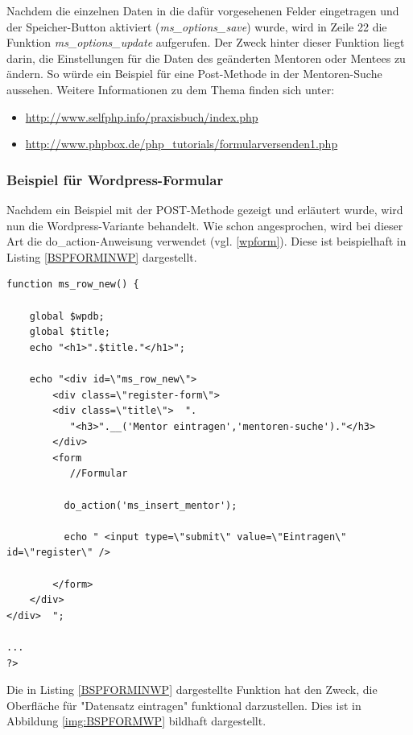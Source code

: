 Nachdem die einzelnen Daten in die dafür vorgesehenen Felder eingetragen und der Speicher-Button aktiviert (\emph{ms\_options\_save}) wurde, wird in Zeile 22 die Funktion \emph{ms\_options\_update} aufgerufen. Der Zweck hinter dieser Funktion liegt darin, die Einstellungen für die Daten des geänderten Mentoren oder Mentees zu ändern.\newline
So würde ein Beispiel für eine Post-Methode in der Mentoren-Suche aussehen. Weitere Informationen zu dem Thema finden sich unter:
\begin{itemize}
	\item \url{http://www.selfphp.info/praxisbuch/index.php}
	\item \url{http://www.phpbox.de/php\_tutorials/formularversenden1.php}
\end{itemize}
\subsubsection{Beispiel für Wordpress-Formular}
Nachdem ein Beispiel mit der POST-Methode gezeigt und erläutert wurde, wird nun die Wordpress-Variante behandelt.\newline
Wie schon angesprochen, wird bei dieser Art die do\_action-Anweisung verwendet (vgl. \ref{wpform}). Diese ist beispielhaft in Listing \ref{BSPFORMINWP} dargestellt.
\begin{lstlisting}
function ms_row_new() {
	
	global $wpdb;
	global $title;
	echo "<h1>".$title."</h1>";
	
	echo "<div id=\"ms_row_new\">  
        <div class=\"register-form\">  
        <div class=\"title\">  ".
           "<h3>".__('Mentor eintragen','mentoren-suche')."</h3>
        </div>  
        <form
           //Formular

		  do_action('ms_insert_mentor');
			
		  echo " <input type=\"submit\" value=\"Eintragen\" id=\"register\" />  
		  
        </form>  
	</div>
</div>  ";

...
?>
\end{lstlisting}
Die in Listing \ref{BSPFORMINWP} dargestellte Funktion hat den Zweck, die Oberfläche für "Datensatz eintragen" funktional darzustellen. Dies ist in Abbildung \ref{img:BSPFORMWP} bildhaft dargestellt.
